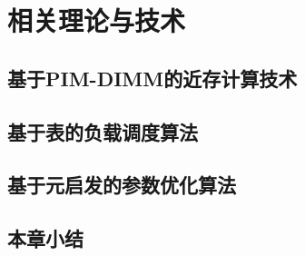 \chapter{相关理论与技术}\label{chap:Theory_And_Techs}

\section{基于PIM-DIMM的近存计算技术}\label{chap:PNM_with_PIM_DIMM_intro}

\section{基于表的负载调度算法}\label{sec:list_schedule_algorithm_intro}

\section{基于元启发的参数优化算法}\label{sec:metaheuristic_based_args_optimization_intro}

\section{本章小结}\label{sec:chap2_summary}